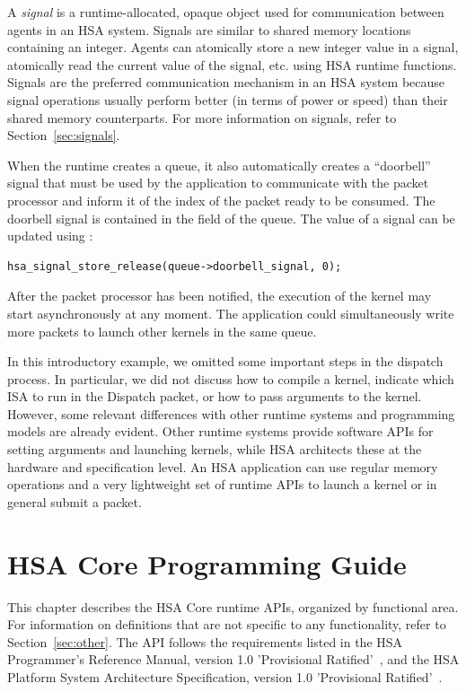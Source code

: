 \documentclass[final,oneside]{book}
\begin{document}
A \emph{signal} is a runtime-allocated, opaque object used for communication
between agents in an HSA system. Signals are similar to shared memory locations
containing an integer. Agents can atomically store a new integer value in a
signal, atomically read the current value of the signal, etc. using HSA runtime
functions.  Signals are the preferred communication mechanism in an HSA system
because signal operations usually perform better (in terms of power or speed)
than their shared memory counterparts. For more information on signals, refer to
Section~\ref{sec:signals}.

When the runtime creates a queue, it also automatically creates a ``doorbell''
signal that must be used by the application to communicate with the packet
processor and inform it of the index of the packet ready to be consumed. The
doorbell signal is contained in the  field
of the queue. The value of a signal can be updated using
:

\begin{lstlisting}
hsa_signal_store_release(queue->doorbell_signal, 0);
\end{lstlisting}

After the packet processor has been notified, the execution of the kernel may
start asynchronously at any moment. The application could simultaneously write
more packets to launch other kernels in the same queue.

In this introductory example, we omitted some important steps in the dispatch
process. In particular, we did not discuss how to compile a kernel, indicate
which ISA to run in the Dispatch packet, or how to pass arguments to the
kernel. However, some relevant differences with other runtime systems and
programming models are already evident.  Other runtime systems provide software
APIs for setting arguments and launching kernels, while HSA architects these at
the hardware and specification level. An HSA application can use regular memory
operations and a very lightweight set of runtime APIs to launch a kernel or in
general submit a packet.


\chapter{HSA Core Programming Guide} \label{coreapi}

This chapter describes the HSA Core runtime APIs, organized by functional
area. For information on definitions that are not specific to any functionality,
refer to Section~\ref{sec:other}. The API follows the requirements listed in the
HSA Programmer's Reference Manual, version 1.0 'Provisional
Ratified'~\cite{prm}, and the HSA Platform System Architecture Specification,
version 1.0 'Provisional Ratified'~\cite{sar}.
\end{document}
